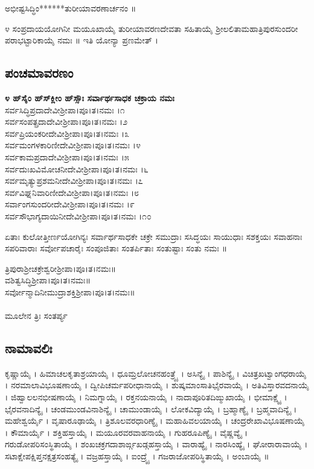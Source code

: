  ಅಭೀಷ್ಟಸಿದ್ಧಿಂ******ತುರೀಯಾವರಣಾರ್ಚನಂ ॥

೪ ಸಂಪ್ರದಾಯಯೋಗಿನೀ ಮಯೂಖಾಯೈ ತುರೀಯಾವರಣದೇವತಾ ಸಹಿತಾಯೈ ಶ್ರೀಲಲಿತಾಮಹಾತ್ರಿಪುರಸುಂದರೀ ಪರಾಭಟ್ಟಾರಿಕಾಯೈ ನಮಃ ॥ ಇತಿ ಯೋನ್ಯಾ ಪ್ರಣಮೇತ್ ।
\subsection{ಪಂಚಮಾವರಣಂ}
{\bfseries ೪ ಹ್‌ಸೈಂ ಹ್‌ಸ್‌ಕ್ಲೀಂ ಹ್‌ಸ್ಸೌಃ ಸರ್ವಾರ್ಥಸಾಧಕ ಚಕ್ರಾಯ ನಮಃ}\\
 ಸರ್ವಸಿದ್ಧಿಪ್ರದಾದೇವೀಶ್ರೀಪಾ।ಪೂ।ತ।ನಮಃ ।೧\\
 ಸರ್ವಸಂಪತ್ಪ್ರದಾದೇವೀಶ್ರೀಪಾ।ಪೂ।ತ।ನಮಃ ।೨\\
 ಸರ್ವಪ್ರಿಯಂಕರೀದೇವೀಶ್ರೀಪಾ।ಪೂ।ತ।ನಮಃ ।೩\\
 ಸರ್ವಮಂಗಳಕಾರಿಣೀದೇವೀಶ್ರೀಪಾ।ಪೂ।ತ।ನಮಃ ।೪\\
 ಸರ್ವಕಾಮಪ್ರದಾದೇವೀಶ್ರೀಪಾ।ಪೂ।ತ।ನಮಃ ।೫\\
 ಸರ್ವದುಃಖವಿಮೋಚನೀದೇವೀಶ್ರೀಪಾ।ಪೂ।ತ।ನಮಃ ।೬\\
 ಸರ್ವಮೃತ್ಯುಪ್ರಶಮನೀದೇವೀಶ್ರೀಪಾ।ಪೂ।ತ।ನಮಃ ।೭\\
 ಸರ್ವವಿಘ್ನನಿವಾರಿಣೀದೇವೀಶ್ರೀಪಾ।ಪೂ।ತ।ನಮಃ ।೮\\
 ಸರ್ವಾಂಗಸುಂದರೀದೇವೀಶ್ರೀಪಾ।ಪೂ।ತ।ನಮಃ ।೯\\
 ಸರ್ವಸೌಭಾಗ್ಯದಾಯಿನೀದೇವೀಶ್ರೀಪಾ।ಪೂ।ತ।ನಮಃ ।೧೦

 ಏತಾಃ ಕುಲೋತ್ತೀರ್ಣಯೋಗಿನ್ಯಃ ಸರ್ವಾರ್ಥಸಾಧಕೇ ಚಕ್ರೇ ಸಮುದ್ರಾಃ ಸಸಿದ್ಧಯಃ ಸಾಯುಧಾಃ ಸಶಕ್ತಯಃ ಸವಾಹನಾಃ ಸಪರಿವಾರಾಃ ಸರ್ವೋಪಚಾರೈಃ ಸಂಪೂಜಿತಾಃ ಸಂತರ್ಪಿತಾಃ ಸಂತುಷ್ಟಾಃ ಸಂತು ನಮಃ ॥

 ತ್ರಿಪುರಾಶ್ರೀಚಕ್ರೇಶ್ವರೀಶ್ರೀಪಾ।ಪೂ।ತ।ನಮಃ॥\\
 ವಶಿತ್ವಸಿದ್ಧಿಶ್ರೀಪಾ।ಪೂ।ತ।ನಮಃ॥\\
ಸರ್ವೋನ್ಮಾದಿನೀಮುದ್ರಾಶಕ್ತಿಶ್ರೀಪಾ।ಪೂ।ತ।ನಮಃ॥\\
\\
ಮೂಲೇನ ತ್ರಿಃ ಸಂತರ್ಪ್ಯ
\subsection{ನಾಮಾವಲಿಃ}
ಕೃಷ್ಣಾಯೈ । ಹಿಮಾಚಲಕೃತಾಶ್ರಯಾಯೈ । ಧೂಮ್ರಲೋಚನಹಂತ್ರ್ಯೈ । ಅಸಿನ್ಯೈ । ಪಾಶಿನ್ಯೈ । ವಿಚಿತ್ರಖಟ್ವಾಂಗಧರಾಯೈ । ನರಮಾಲಾವಿಭೂಷಣಾಯೈ । ದ್ವೀಪಿಚರ್ಮಪರೀಧಾನಾಯೈ । ಶುಷ್ಕಮಾಂಸಾತಿಭೈರವಾಯೈ । ಅತಿವಿಸ್ತಾರವದನಾಯೈ । ಜಿಹ್ವಾಲಲನಭೀಷಣಾಯೈ । ನಿಮಗ್ನಾಯೈ । ರಕ್ತನಯನಾಯೈ । ನಾದಾಪೂರಿತದಿಙ್ಮುಖಾಯೈ । ಭೀಮಾಕ್ಷ್ಯೈ । ಭೈರವನಾದಿನ್ಯೈ । ಚಂಡಮುಂಡವಿನಾಶಿನ್ಯೈ । ಚಾಮುಂಡಾಯೈ । ಲೋಕವಿದ್ಯಾಯೈ । ಬ್ರಹ್ಮಾಣ್ಯೈ । ಬ್ರಹ್ಮವಾದಿನ್ಯೈ । ಮಹೇಶ್ವರ್ಯೈ । ವೃಷಾರೂಢಾಯೈ । ತ್ರಿಶೂಲವರಧಾರಿಣ್ಯೈ । ಮಹಾಹಿವಲಯಾಯೈ । ಚಂದ್ರರೇಖಾವಿಭೂಷಣಾಯೈ । ಕೌಮಾರ್ಯೈ । ಶಕ್ತಿಹಸ್ತಾಯೈ । ಮಯೂರವರವಾಹನಾಯೈ । ಗುಹರೂಪಿಣ್ಯೈ । ವೈಷ್ಣವ್ಯೈ । ಗರುಡೋಪರಿಸಂಸ್ಥಿತಾಯೈ । ಶಂಖಚಕ್ರಗದಾಶಾರ್ಙ್ಗಖಡ್ಗಹಸ್ತಾಯೈ । ವಾರಾಹ್ಯೈ । ನಾರಸಿಂಹ್ಯೈ । ಘೋರಾರಾವಾಯೈ । ಸಟಾಕ್ಷೇಪಕ್ಷಿಪ್ತನಕ್ಷತ್ರಸಂಹತ್ಯೈ । ವಜ್ರಹಸ್ತಾಯೈ । ಐಂದ್ರ್ಯೈ । ಗಜರಾಜೋಪರಿಸ್ಥಿತಾಯೈ । ಅಂಬಾಯೈ ॥\\

